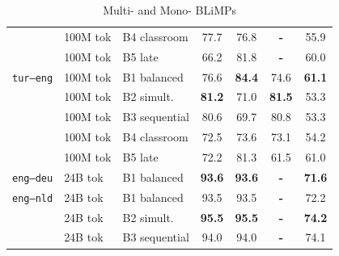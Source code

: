 \begin{table}[t]
\begin{minipage}[t]{0.49\linewidth}
\begin{tabular}{ll l cc cc}
 & 100M tok & B4 classroom & \cellcolor[rgb]{0.847,1.000,0.847} 77.7 & \cellcolor[rgb]{0.854,1.000,0.854} 76.8 & \textbf{-} & \cellcolor[rgb]{0.951,1.000,0.951} 55.9 \\
 & 100M tok & B5 late & \cellcolor[rgb]{0.910,1.000,0.910} 66.2 & \cellcolor[rgb]{0.827,1.000,0.827} 81.8 & \textbf{-} & \cellcolor[rgb]{0.918,1.000,0.918} 60.0 \\
\midrule
\texttt{tur--eng} & 100M tok & B1 balanced & \cellcolor[rgb]{0.853,1.000,0.853} 76.6 & \cellcolor[rgb]{0.812,1.000,0.812} \textbf{84.4} & \cellcolor[rgb]{0.825,1.000,0.825} 74.6 & \cellcolor[rgb]{0.909,1.000,0.909} \textbf{61.1} \\
 & 100M tok & B2 simult. & \cellcolor[rgb]{0.827,1.000,0.827} \textbf{81.2} & \cellcolor[rgb]{0.885,1.000,0.885} 71.0 & \cellcolor[rgb]{0.776,1.000,0.776} \textbf{81.5} & \cellcolor[rgb]{0.973,1.000,0.973} 53.3 \\
 & 100M tok & B3 sequential & \cellcolor[rgb]{0.831,1.000,0.831} 80.6 & \cellcolor[rgb]{0.893,1.000,0.893} 69.7 & \cellcolor[rgb]{0.781,1.000,0.781} 80.8 & \cellcolor[rgb]{0.973,1.000,0.973} 53.3 \\
 & 100M tok & B4 classroom & \cellcolor[rgb]{0.876,1.000,0.876} 72.5 & \cellcolor[rgb]{0.871,1.000,0.871} 73.6 & \cellcolor[rgb]{0.836,1.000,0.836} 73.1 & \cellcolor[rgb]{0.965,1.000,0.965} 54.2 \\
 & 100M tok & B5 late & \cellcolor[rgb]{0.877,1.000,0.877} 72.2 & \cellcolor[rgb]{0.829,1.000,0.829} 81.3 & \cellcolor[rgb]{0.918,1.000,0.918} 61.5 & \cellcolor[rgb]{0.909,1.000,0.909} 61.0 \\
\midrule
\texttt{eng--deu} & 24B tok & B1 balanced & \cellcolor[rgb]{0.759,1.000,0.759} \textbf{93.6} & \cellcolor[rgb]{0.762,1.000,0.762} \textbf{93.6} & \textbf{-} & \cellcolor[rgb]{0.822,1.000,0.822} \textbf{71.6} \\
\midrule
\texttt{eng--nld} & 24B tok & B1 balanced & \cellcolor[rgb]{0.759,1.000,0.759} 93.5 & \cellcolor[rgb]{0.763,1.000,0.763} 93.5 & \textbf{-} & \cellcolor[rgb]{0.817,1.000,0.817} 72.2 \\
 & 24B tok & B2 simult. & \cellcolor[rgb]{0.748,1.000,0.748} \textbf{95.5} & \cellcolor[rgb]{0.752,1.000,0.752} \textbf{95.5} & \textbf{-} & \cellcolor[rgb]{0.801,1.000,0.801} \textbf{74.2} \\
 & 24B tok & B3 sequential & \cellcolor[rgb]{0.757,1.000,0.757} 94.0 & \cellcolor[rgb]{0.760,1.000,0.760} 94.0 & \textbf{-} & \cellcolor[rgb]{0.802,1.000,0.802} 74.1 \\
\bottomrule
\end{tabular}
\end{minipage}
\caption{Multi- and Mono- BLiMPs}
\label{tab:beetle_main}
\end{table}


